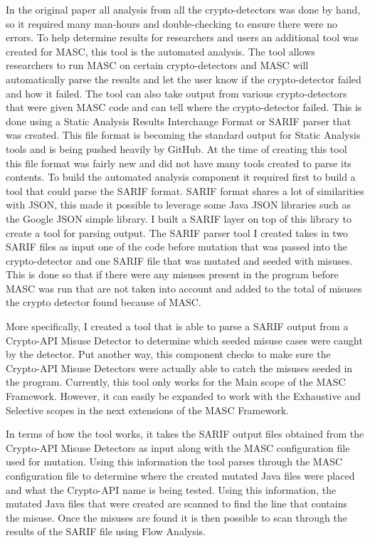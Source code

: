 In the original paper all analysis from all the crypto-detectors was done by hand, so it required many man-hours and double-checking to ensure there were no errors. To help determine results for researchers and users an additional tool was created for MASC, this tool is the automated analysis. The tool allows researchers to run MASC on certain crypto-detectors and MASC will automatically parse the results and let the user know if the crypto-detector failed and how it failed. The tool can also take output from various crypto-detectors that were given MASC code and can tell where the crypto-detector failed. This is done using a Static Analysis Results Interchange Format or SARIF parser that was created. This file format is becoming the standard output for Static Analysis tools and is being pushed heavily by GitHub. At the time of creating this tool this file format was fairly new and did not have many tools created to parse its contents. To build the automated analysis component it required first to build a tool that could parse the SARIF format. SARIF format shares a lot of similarities with JSON, this made it possible to leverage some Java JSON libraries such as the Google JSON simple library. I built a SARIF layer on top of this library to create a tool for parsing output. The SARIF parser tool I created takes in two SARIF files as input one of the code before mutation that was passed into the crypto-detector and one SARIF file that was mutated and seeded with misuses. This is done so that if there were any misuses present in the program before MASC was run that are not taken into account and added to the total of misuses the crypto detector found because of MASC. 

More specifically, I created a tool that is able to parse a SARIF output from a Crypto-API Misuse Detector to determine which seeded misuse cases were caught by the detector.  Put another way, this component checks to make sure the Crypto-API Misuse Detectors were actually able to catch the misuses seeded in the program. Currently, this tool only works for the Main scope of the MASC Framework.  However, it can easily be expanded to work with the Exhaustive and Selective scopes in the next extensions of the MASC Framework. 
    
In terms of how the tool works, it takes the SARIF output files obtained from the Crypto-API Misuse Detectors as input along with the MASC configuration file used for mutation. Using this information the tool parses through the MASC configuration file to determine where the created mutated Java files were placed and what the Crypto-API name is being tested.  Using this information, the mutated Java files that were created are scanned to find the line that contains the misuse.  Once the misuses are found it is then possible to scan through the results of the SARIF file using Flow Analysis.

